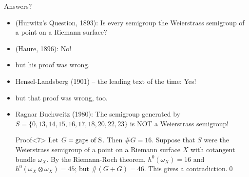 \documentclass[12pt, aspectratio=169]{beamer}
\begin{document}
\begin{frame}{Answers?}
 
\begin{itemize}
 \item<1-6> (Hurwitz's Question, 1893):\alert{ Is every semigroup the Weierstrass semigroup of a point
on a Riemann surface?}
\item <2-> \qquad (Haure, 1896): No!
\item<3-> \qquad\qquad but his proof was wrong.
\item<4-> \qquad Hensel-Landsberg (1901) -- the leading text of the time: Yes!
\item<5-> \qquad\qquad but that proof was wrong, too.
\item<6-> \qquad \alert{Ragnar Buchweitz} (1980): The semigroup generated by
$S = \{0, 13, 14, 15, 16, 17, 18, 20, 22, 23\} $ is NOT a Weierstrass semigroup! 
\smallskip

\begin{block}{Proof}<7>
 Let $G= \hbox{gaps of S}$. Then $\#G = 16$. Suppose that $S$ were the Weierstrass semigroup
of a point on a Riemann surface $X$ with cotangent bundle $\omega_X$. By the Riemann-Roch theorem,
$h^0(\omega_X) = 16$ and $h^0(\omega_X\otimes \omega_X) = 45$; but $\#(G+G) = 46$. This gives a  contradiction.\qed
\end{block}

\end{itemize}
\end{frame}

\end{document}
